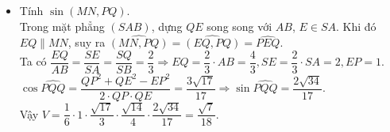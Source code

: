 \begin{ex}
{\begin{itemize}
		\[\dfrac{1}{\mathrm{d}(M,(SAB))}=\dfrac{1}{MA^2}+\dfrac{1}{MB^2}+\dfrac{1}{MS^2}=\dfrac{1}{2}+\dfrac{1}{2}+\dfrac{1}{7}=\dfrac{8}{7} \Rightarrow \mathrm{d}(M,(SAB)) =\dfrac{\sqrt{14}}{4}.\]
		\item Tính $\sin (MN,PQ)$.\\
		Trong mặt phẳng $(SAB)$, dựng $QE$ song song với $AB$, $E \in SA$. Khi đó $EQ \parallel MN$, suy ra $\widehat{(MN,PQ)}= \widehat{(EQ,PQ)}=\widehat{PEQ}$.\\
		Ta có $\dfrac{EQ}{AB}=\dfrac{SE}{SA}=\dfrac{SQ}{SB}=\dfrac{2}{3} \Rightarrow EQ=\dfrac{2}{3} \cdot AB=\dfrac{4}{3}, SE=\dfrac{2}{3} \cdot SA=2, EP=1$.\\
		$\cos \widehat{PQQ}=\dfrac{QP^2+QE^2-EP^2}{2 \cdot QP \cdot QE}=\dfrac{3\sqrt{17}}{17} \Rightarrow \sin \widehat{PQQ}= \dfrac{2\sqrt{34}}{17}$.\\
		Vậy $V= \dfrac{1}{6} \cdot 1 \cdot \dfrac{\sqrt{17}}{3} \cdot \dfrac{\sqrt{14}}{4} \cdot \dfrac{2\sqrt{34}}{17}=  \dfrac{\sqrt{7}}{18} $.
	\end{itemize}		
	}
\end{ex}
